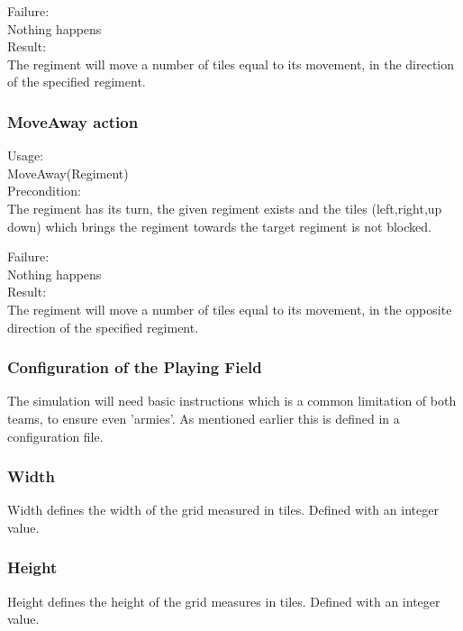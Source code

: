 		Failure: \\
		Nothing happens \\
		
		Result: \\
		The regiment will move a number of tiles equal to its movement, in the direction of the specified regiment.
		
		\subsubsection{MoveAway action}
		Usage: \\
		MoveAway(Regiment) \\
		
		Precondition: \\
		The regiment has its turn, the given regiment exists and the tiles (left,right,up down) 
		which brings the regiment towards the target regiment is not blocked.
		
		Failure: \\
		Nothing happens \\
		
		Result: \\
		The regiment will move a number of tiles equal to its movement, in the opposite direction of the specified regiment.
				
		\subsubsection{Configuration of the Playing Field}
		The simulation will need basic instructions which is a common limitation of both teams, to ensure even 'armies'. 
		As mentioned earlier this is defined in a configuration file.
		
		\subsubsection{Width}
		Width defines the width of the grid measured in tiles.
		Defined with an integer value.
		
		\subsubsection{Height}
		Height defines the height of the grid measures in tiles.
		Defined with an integer value.
		
